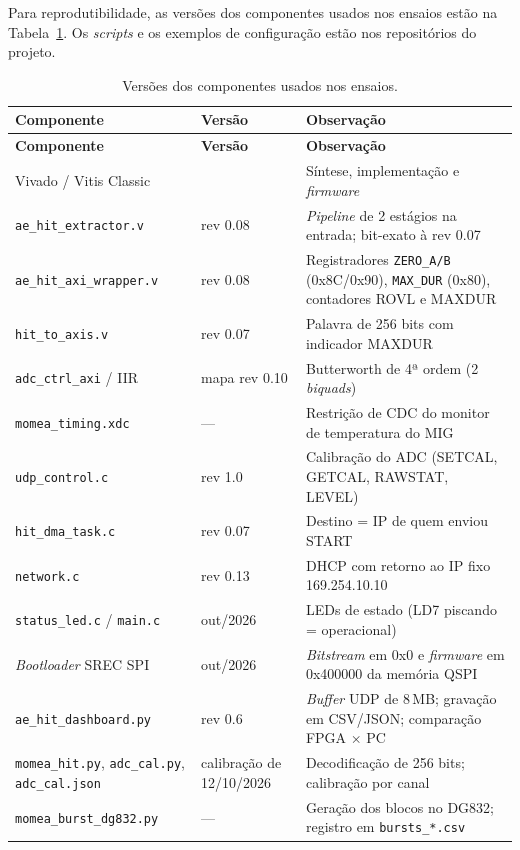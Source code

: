 Para reprodutibilidade, as versões dos componentes usados nos ensaios estão na Tabela~\ref{v2:tab:reprodutibilidade}. Os \textit{scripts} e os exemplos de configuração estão nos repositórios do projeto.

\begingroup
\footnotesize
\renewcommand{\arraystretch}{1.15}
\begin{longtable}{|>{\raggedright\arraybackslash}p{}|>{\raggedright\arraybackslash}p{}|>{\raggedright\arraybackslash}p{}|}
	\caption{Versões dos componentes usados nos ensaios.}
	\label{v2:tab:reprodutibilidade}\\
	\hline
	\textbf{Componente} & \textbf{Versão} & \textbf{Observação} \\
	\hline
	\endfirsthead
	\hline
	\textbf{Componente} & \textbf{Versão} & \textbf{Observação} \\
	\hline
	\endhead
	\hline
	\endlastfoot
	Vivado / Vitis Classic & 2024.2 & Síntese, implementação e \textit{firmware} \\
	\hline
	\texttt{ae\_hit\_extractor.v} & rev 0.08 & \textit{Pipeline} de 2 estágios na entrada; bit-exato à rev 0.07 \\
	\hline
	\texttt{ae\_hit\_axi\_wrapper.v} & rev 0.08 & Registradores \texttt{ZERO\_A/B} (0x8C/0x90), \texttt{MAX\_DUR} (0x80), contadores ROVL e MAXDUR \\
	\hline
	\texttt{hit\_to\_axis.v} & rev 0.07 & Palavra de 256 bits com indicador MAXDUR \\
	\hline
	\texttt{adc\_ctrl\_axi} / IIR & mapa rev 0.10 & Butterworth de 4ª ordem (2 \textit{biquads}) \\
	\hline
	\texttt{momea\_timing.xdc} & --- & Restrição de CDC do monitor de temperatura do MIG \\
	\hline
	\texttt{udp\_control.c} & rev 1.0 & Calibração do ADC (SETCAL, GETCAL, RAWSTAT, LEVEL) \\
	\hline
	\texttt{hit\_dma\_task.c} & rev 0.07 & Destino = IP de quem enviou START \\
	\hline
	\texttt{network.c} & rev 0.13 & DHCP com retorno ao IP fixo 169.254.10.10 \\
	\hline
	\texttt{status\_led.c} / \texttt{main.c} & out/2026 & LEDs de estado (LD7 piscando = operacional) \\
	\hline
	\textit{Bootloader} SREC SPI & out/2026 & \textit{Bitstream} em 0x0 e \textit{firmware} em 0x400000 da memória QSPI \\
	\hline
	\texttt{ae\_hit\_dashboard.py} & rev 0.6 & \textit{Buffer} UDP de 8\,MB; gravação em CSV/JSON; comparação FPGA \(\times\) PC \\
	\hline
	\texttt{momea\_hit.py}, \texttt{adc\_cal.py}, \texttt{adc\_cal.json} & calibração de 12/10/2026 & Decodificação de 256 bits; calibração por canal \\
	\hline
	\texttt{momea\_burst\_dg832.py} & --- & Geração dos blocos no DG832; registro em \texttt{bursts\_*.csv} \\
	\hline
	\hline
	\hline
	\hline
\end{longtable}
\endgroup


